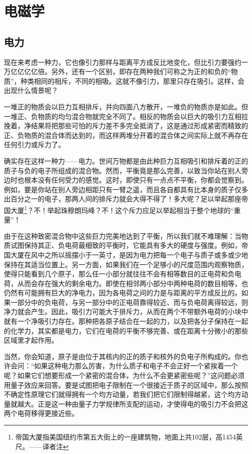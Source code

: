\chapter{电磁学}

\section{电力}

现在来考虑一种力，它也像引力那样与距离平方成反比地变化，但比引力要强约一万亿亿亿亿倍。另外，还有一个区别，即存在两种我们可称之为正的和负的“物质”，种类相同的相斥，不同的相吸。这就不像引力，那里只存在吸引。这样，会出现什么情景呢？

一堆正的物质会以巨力互相排斥，并向四面八方散开，一堆负的物质亦是如此。但一堆正、负物质的均匀混合物就完全不同了。相反的物质会以巨大的吸引力互相拉挽着，净结果将把那些可怕的斥力差不多完全抵消了，这是通过形成紧密而精致的正、负物质的混合体而达到的，而这样两堆分开着的混合体之间实际上就不再存在任何引力或斥力了。

确实存在这样一种力——电力。世间万物都是由此种巨力互相吸引和排斥着的正的质子与负的电子所组成的混合物。然而，平衡竟是那么完善，以致当你站在别人旁边时也根本没有任何受力的感觉。这时，即使只有一点点不平衡，你都会觉察到。例如，要是你站在别人旁边相距只有一臂之遥，而且各自都具有比本身的质子仅多出百分之一的电子，那两人间的排斥力就会大得不得了！多大呢？足以举起那座帝国大厦\footnote{帝国大厦指美国纽约市第五大街上的一座建筑物，地面上共102层，高1454英尺。——译者注}？不！举起珠穆朗玛峰？不！这个斥力应足以举起相当于整个地球的“重量”！

由于在这种致密混合物中这些巨力完美地达到了平衡，所以我们就不难理解：当物质试图保持其正、负电荷最细致的平衡时，它能具有多大的硬度与强度。例如，帝国大厦在风中之所以摇摆小于一英寸，是因为电力把每一个电子与质子或多或少地保持在其适当位置上。另一方面，如果我们在一个足够小的尺度范围内观察物质，使得只能看到几个原子，那么任一小部分就往往不会有相等数目的正电荷和负电荷，从而会存在强大的剩余电力。即使在相邻两小部分中两种电荷的数目相等，也仍然有可能拥有巨大的净电力，因为各电荷之间的力是与距离的平方成反比的。如果一部分中的负电荷，与另一部分中的正电荷靠得较近、而与负电荷离得较远，则净力就会产生。因此，吸引力可能大于排斥力，从而在两个不带额外电荷的小块中就有一个净吸引力存在。那种把各原子结合在一起的力，以及把各分子保持在一起的化学力，其实都是电力，它们在电荷的平衡不够完善、或在距离十分微小的那些区域里才起作用。

当然，你会知道，原子是由位于其核内的正的质子和核外的负电子所构成的。你也许会问：“如果这种电力那么厉害，为什么质子和电子不会正好一个紧挨着一个呢？如果它们想要形成一个紧密的混合体，为什么不会更紧密些呢？”这问题必须用量子效应来回答。要是试图把电子限制在一个很接近于质子的区域中，那么按照不确定性原理它们就得拥有一个均方动量，若我们把它们限制得越紧，这个均方动量就越大。正是这一种由量子力学规律所支配的运动，才使得电的吸引力不会把这两个电荷移得更接近些。


